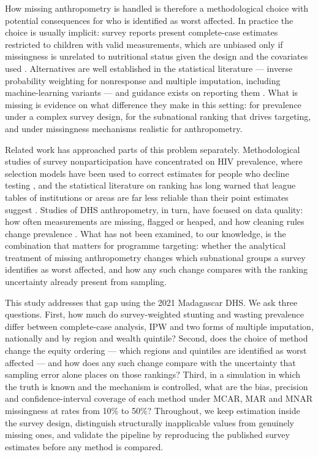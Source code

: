 \documentclass[11pt,a4paper]{article}
\begin{document}
How missing anthropometry is handled is therefore a methodological
choice with potential consequences for who is identified as worst
affected. In practice the choice is usually implicit: survey reports
present complete-case estimates restricted to children with valid
measurements, which are unbiased only if missingness is unrelated to
nutritional status given the design and the covariates used
\cite{little2019statistical}. Alternatives are well established in the
statistical literature --- inverse probability weighting for nonresponse
\cite{seaman2013review} and multiple imputation, including
machine-learning variants
\cite{vanbuuren2011mice,doove2014recursive,shah2014comparison} --- and
guidance exists on reporting them \cite{lee2021framework}. What is
missing is evidence on what difference they make in this setting: for
prevalence under a complex survey design, for the subnational ranking
that drives targeting, and under missingness mechanisms realistic for
anthropometry.

Related work has approached parts of this problem separately.
Methodological studies of survey nonparticipation have concentrated on
HIV prevalence, where selection models have been used to correct
estimates for people who decline testing
\cite{barnighausen2011correcting}, and the statistical literature on
ranking has long warned that league tables of institutions or areas are
far less reliable than their point estimates suggest
\cite{goldstein1996league,marshall1998reliability}. Studies of DHS
anthropometry, in turn, have focused on data quality: how often
measurements are missing, flagged or heaped, and how cleaning rules
change prevalence
\cite{crowe2014effect,assaf2015assessment,perumal2020anthropometric}.
What has not been examined, to our knowledge, is the combination that
matters for programme targeting: whether the analytical treatment of
missing anthropometry changes which subnational groups a survey
identifies as worst affected, and how any such change compares with the
ranking uncertainty already present from sampling.

This study addresses that gap using the 2021 Madagascar DHS. We ask
three questions. First, how much do survey-weighted stunting and wasting
prevalence differ between complete-case analysis, IPW and two forms of
multiple imputation, nationally and by region and wealth quintile?
Second, does the choice of method change the equity ordering --- which
regions and quintiles are identified as worst affected --- and how does
any such change compare with the uncertainty that sampling error alone
places on those rankings? Third, in a simulation in which the truth is
known and the mechanism is controlled, what are the bias, precision and
confidence-interval coverage of each method under MCAR, MAR and MNAR
missingness at rates from 10\% to 50\%? Throughout, we keep estimation
inside the survey design, distinguish structurally inapplicable values
from genuinely missing ones, and validate the pipeline by reproducing
the published survey estimates before any method is compared.
\end{document}
